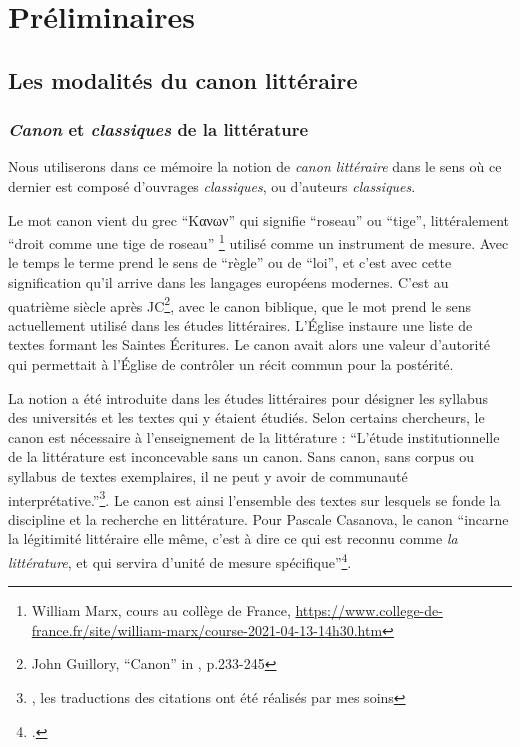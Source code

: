\part{Préliminaires}

\chapter{Les modalités du canon littéraire}

\section{\textit{Canon} et \textit{classiques} de la littérature}

Nous utiliserons dans ce mémoire la notion de \textit{canon littéraire} dans le sens où ce dernier est composé d'ouvrages \textit{classiques}, ou d'auteurs \textit{classiques}. 

Le mot canon vient du grec \enquote{\foreignlanguage{greek}{Κανων}} qui signifie \enquote{roseau} ou \enquote{tige}, littéralement \enquote{droit comme une tige de roseau} \footnote{William Marx,  cours au collège de France, \url{https://www.college-de-france.fr/site/william-marx/course-2021-04-13-14h30.htm}} utilisé comme un instrument de mesure. Avec le temps le terme prend le sens de \enquote{règle} ou de \enquote{loi}, et c'est avec cette signification qu'il arrive dans les langages européens modernes. C'est au quatrième siècle après JC\footnote{John Guillory, \enquote{Canon} in \cite{lentricchia_critical_2012},  p.233-245}, avec le canon biblique, que le mot prend le sens actuellement utilisé dans les études littéraires. L'Église instaure une liste de textes formant les Saintes Écritures. Le canon avait alors une valeur d'autorité qui permettait à l'Église de contrôler un récit commun pour la postérité.


La notion a été introduite dans les études littéraires pour désigner les syllabus des universités et les textes qui y étaient étudiés. Selon certains chercheurs, le canon est nécessaire à l'enseignement de la littérature : \enquote{L'étude institutionnelle de la littérature est inconcevable sans un canon. Sans canon, sans corpus ou syllabus de textes exemplaires, il ne peut y avoir de communauté interprétative.}\footnote{\cite{felperin_beyond_1985}, les traductions des citations ont été réalisés par mes soins}. Le canon est ainsi l'ensemble des textes sur lesquels se fonde la discipline et la recherche en littérature. Pour Pascale Casanova, le canon \enquote{incarne la légitimité littéraire elle même, c'est à dire ce qui est reconnu comme \textit{la littérature}, et qui servira d'unité de mesure spécifique}\footcites{casanova_republique_2008}.  

